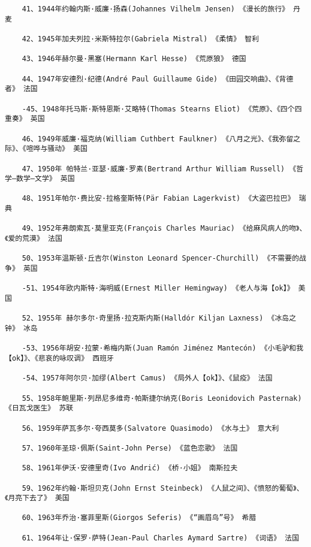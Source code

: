 \documentclass[UTF8]{../../RepresentationUniverse}
\begin{document}
\begin{lstlisting}
    41、1944年约翰内斯·威廉·扬森(Johannes Vilhelm Jensen) 《漫长的旅行》 丹麦
    
    42、1945年加夫列拉·米斯特拉尔(Gabriela Mistral) 《柔情》 智利
    
    43、1946年赫尔曼·黑塞(Hermann Karl Hesse) 《荒原狼》 德国
    
    44、1947年安德烈·纪德(André Paul Guillaume Gide) 《田园交响曲》、《背德者》 法国
    
    -45、1948年托马斯·斯特恩斯·艾略特(Thomas Stearns Eliot) 《荒原》、《四个四重奏》 英国
    
    46、1949年威廉·福克纳(William Cuthbert Faulkner) 《八月之光》、《我弥留之际》、《喧哗与骚动》 美国
    
    47、1950年 帕特兰·亚瑟·威廉·罗素(Bertrand Arthur William Russell) 《哲学—数学—文学》 英国
    
    48、1951年帕尔·费比安·拉格奎斯特(Pär Fabian Lagerkvist) 《大盗巴拉巴》 瑞典
    
    49、1952年弗朗索瓦·莫里亚克(François Charles Mauriac) 《给麻风病人的吻》、《爱的荒漠》 法国
    
    50、1953年温斯顿·丘吉尔(Winston Leonard Spencer-Churchill) 《不需要的战争》 英国
    
    -51、1954年欧内斯特·海明威(Ernest Miller Hemingway) 《老人与海【ok】》 美国
    
    52、1955年 赫尔多尔·奇里扬·拉克斯内斯(Halldór Kiljan Laxness) 《冰岛之钟》 冰岛
    
    -53、1956年胡安·拉蒙·希梅内斯(Juan Ramón Jiménez Mantecón) 《小毛驴和我【ok】》、《悲哀的咏叹调》 西班牙
    
    -54、1957年阿尔贝·加缪(Albert Camus) 《局外人【ok】》、《鼠疫》 法国
    
    55、1958年鲍里斯·列昂尼多维奇·帕斯捷尔纳克(Boris Leonidovich Pasternak) 《日瓦戈医生》 苏联
    
    56、1959年萨瓦多尔·夸西莫多(Salvatore Quasimodo) 《水与土》 意大利
    
    57、1960年圣琼·佩斯(Saint-John Perse) 《蓝色恋歌》 法国
    
    58、1961年伊沃·安德里奇(Ivo Andrić) 《桥·小姐》 南斯拉夫
    
    59、1962年约翰·斯坦贝克(John Ernst Steinbeck) 《人鼠之间》、《愤怒的葡萄》、《月亮下去了》 美国
    
    60、1963年乔治·塞菲里斯(Giorgos Seferis) 《“画眉鸟”号》 希腊
    
    61、1964年让·保罗·萨特(Jean-Paul Charles Aymard Sartre) 《词语》 法国
    

\end{lstlisting}
\end{document}
